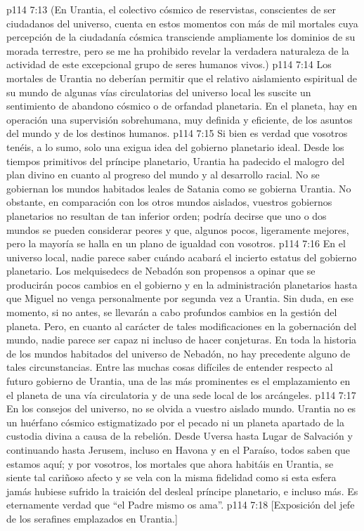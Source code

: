 \vs p114 7:13 \pc (En Urantia, el colectivo cósmico de reservistas, conscientes de ser ciudadanos del universo, cuenta en estos momentos con más de mil mortales cuya percepción de la ciudadanía cósmica transciende ampliamente los dominios de su morada terrestre, pero se me ha prohibido revelar la verdadera naturaleza de la actividad de este excepcional grupo de seres humanos vivos.)
\vs p114 7:14 \pc Los mortales de Urantia no deberían permitir que el relativo aislamiento espiritual de su mundo de algunas vías circulatorias del universo local les suscite un sentimiento de abandono cósmico o de orfandad planetaria. En el planeta, hay en operación una supervisión sobrehumana, muy definida y eficiente, de los asuntos del mundo y de los destinos humanos.
\vs p114 7:15 Si bien es verdad que vosotros tenéis, a lo sumo, solo una exigua idea del gobierno planetario ideal. Desde los tiempos primitivos del príncipe planetario, Urantia ha padecido el malogro del plan divino en cuanto al progreso del mundo y al desarrollo racial. No se gobiernan los mundos habitados leales de Satania como se gobierna Urantia. No obstante, en comparación con los otros mundos aislados, vuestros gobiernos planetarios no resultan de tan inferior orden; podría decirse que uno o dos mundos se pueden considerar peores y que, algunos pocos, ligeramente mejores, pero la mayoría se halla en un plano de igualdad con vosotros.
\vs p114 7:16 En el universo local, nadie parece saber cuándo acabará el incierto estatus del gobierno planetario. Los melquisedecs de Nebadón son propensos a opinar que se producirán pocos cambios en el gobierno y en la administración planetarios hasta que Miguel no venga personalmente por segunda vez a Urantia. Sin duda, en ese momento, si no antes, se llevarán a cabo profundos cambios en la gestión del planeta. Pero, en cuanto al carácter de tales modificaciones en la gobernación del mundo, nadie parece ser capaz ni incluso de hacer conjeturas. En toda la historia de los mundos habitados del universo de Nebadón, no hay precedente alguno de tales circunstancias. Entre las muchas cosas difíciles de entender respecto al futuro gobierno de Urantia, una de las más prominentes es el emplazamiento en el planeta de una vía circulatoria y de una sede local de los arcángeles.
\vs p114 7:17 En los consejos del universo, no se olvida a vuestro aislado mundo. Urantia no es un huérfano cósmico estigmatizado por el pecado ni un planeta apartado de la custodia divina a causa de la rebelión. Desde Uversa hasta Lugar de Salvación y continuando hasta Jerusem, incluso en Havona y en el Paraíso, todos saben que estamos aquí; y por vosotros, los mortales que ahora habitáis en Urantia, se siente tal cariñoso afecto y se vela con la misma fidelidad como si esta esfera jamás hubiese sufrido la traición del desleal príncipe planetario, e incluso más. Es eternamente verdad que “el Padre mismo os ama”.
\vsetoff
\vs p114 7:18 [Exposición del jefe de los serafines emplazados en Urantia.]
